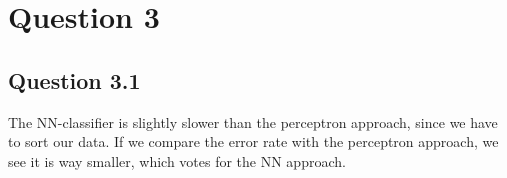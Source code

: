 \documentclass[11pt,twoside,a4paper]{article}
\begin{document}
\section{Question 3}

	\subsection{Question 3.1}
	The NN-classifier is slightly slower than the perceptron approach, since we have to sort our data. If we compare the error rate with the perceptron approach, we see it is way smaller, which votes for the NN approach.  

		
	
\begin{thebibliography}{9}
\end{thebibliography}
\end{document}
